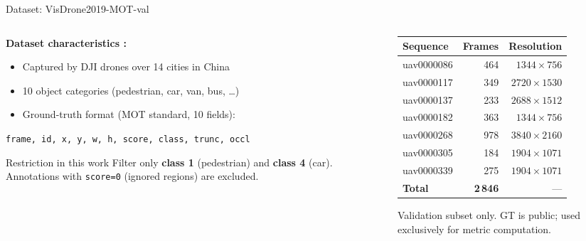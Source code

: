 \documentclass[aspectratio=169]{beamer}
\begin{document}
\begin{frame}{Dataset: VisDrone2019-MOT-val}
  \begin{columns}[T]
    \begin{column}{0.52\textwidth}
      \textbf{Dataset characteristics \cite{zhu2022visdrone}:}
      \begin{itemize}
        \item Captured by DJI drones over 14 cities in China
        \item 10 object categories (pedestrian, car, van, bus, \ldots)
        \item Ground-truth format (MOT standard, 10 fields):
      \end{itemize}
      \vspace{0.2em}
      {\footnotesize
        \texttt{frame, id, x, y, w, h, score, class, trunc, occl}}
      \vspace{0.3em}
      \begin{alertblock}{Restriction in this work}
        \small Filter only \textbf{class 1} (pedestrian) and \textbf{class 4} (car).
        Annotations with \texttt{score=0} (ignored regions) are excluded.
      \end{alertblock}
    \end{column}
    \begin{column}{0.44\textwidth}
      \renewcommand{\arraystretch}{1.2}
      \scriptsize
      \begin{tabular}{lrr}
        \toprule
        \textbf{Sequence} & \textbf{Frames} & \textbf{Resolution} \\
        \midrule
        uav0000086        & 464             & $1344\times756$     \\
        uav0000117        & 349             & $2720\times1530$    \\
        uav0000137        & 233             & $2688\times1512$    \\
        uav0000182        & 363             & $1344\times756$     \\
        uav0000268        & 978             & $3840\times2160$    \\
        uav0000305        & 184             & $1904\times1071$    \\
        uav0000339        & 275             & $1904\times1071$    \\
        \midrule
        \textbf{Total}    & \textbf{2\,846} & ---                 \\
        \bottomrule
      \end{tabular}
      \vspace{0.3em}
      \begin{block}{}
        \scriptsize Validation subset only.
        GT is public; used exclusively for metric computation.
      \end{block}
    \end{column}
  \end{columns}
\end{frame}
\end{document}
